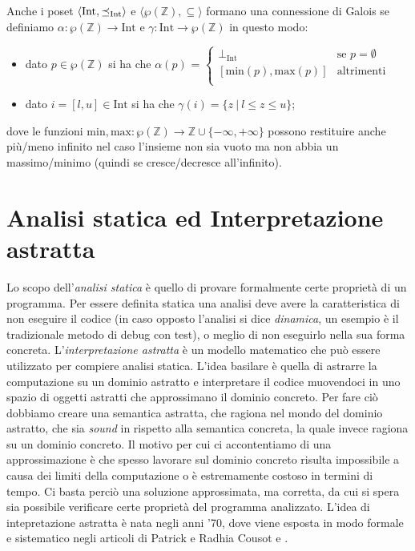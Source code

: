 \begin{example}
Anche i poset \(\langle \textrm{Int}, \preceq_{\textrm{Int}}\rangle\) e \(\langle\wp(\mathbb{Z}), \subseteq\rangle\) formano una connessione di Galois se definiamo \(\alpha:\wp(\mathbb{Z})\rightarrow\textrm{Int}\) e \(\gamma:\textrm{Int}\rightarrow\wp(\mathbb{Z})\) in questo modo:
\begin{itemize}
\item dato \(p\in\wp(\mathbb{Z})\) si ha che \(\alpha(p)\) = 
$
\begin{cases}
\perp_{\textrm{Int}} & \textrm{se } p=\emptyset\\
[\textrm{min}(p), \textrm{max}(p)] & \textrm{altrimenti}\\
\end{cases}
$
    \item dato \(i=[l, u]\in\textrm{Int}\) si ha che \(\gamma(i)=\{z\ |\ l\leq z \leq u\}\);
\end{itemize}
dove le funzioni \(\textrm{min},\textrm{max}:\wp(\mathbb{Z})\rightarrow\mathbb{Z}\cup\{-\infty, +\infty\}\) possono restituire anche più/meno infinito nel caso l'insieme non sia vuoto ma non abbia un massimo/minimo (quindi se cresce/decresce all'infinito).
\end{example}

\section{Analisi statica ed Interpretazione astratta}\label{sec:abstractInt}
Lo scopo dell'\textit{analisi statica} è quello di provare formalmente certe proprietà di un programma. Per essere definita statica una analisi deve avere la caratteristica di non eseguire il codice (in caso opposto l'analisi si dice \textit{dinamica}, un esempio è il tradizionale metodo di debug con test), o meglio di non eseguirlo nella sua forma concreta. L'\textit{interpretazione astratta} è un modello matematico che può essere utilizzato per compiere analisi statica. L'idea basilare è quella di astrarre la computazione su un dominio astratto e interpretare il codice muovendoci in uno spazio di oggetti astratti che approssimano il dominio concreto. Per fare ciò dobbiamo creare una semantica astratta, che ragiona nel mondo del dominio astratto, che sia \textit{sound} in rispetto alla semantica concreta, la quale invece ragiona su un dominio concreto. Il motivo per cui ci accontentiamo di una approssimazione è che spesso lavorare sul dominio concreto risulta impossibile a causa dei limiti della computazione o è estremamente costoso in termini di tempo. Ci basta perciò una soluzione approssimata, ma corretta, da cui si spera sia possibile verificare certe proprietà del programma analizzato. L'idea di intepretazione astratta è nata negli anni '70, dove viene esposta in modo formale e sistematico negli articoli di Patrick e Radhia Cousot \cite{DBLP:conf/popl/CousotC77} e \cite{DBLP:conf/popl/CousotC79}. 

